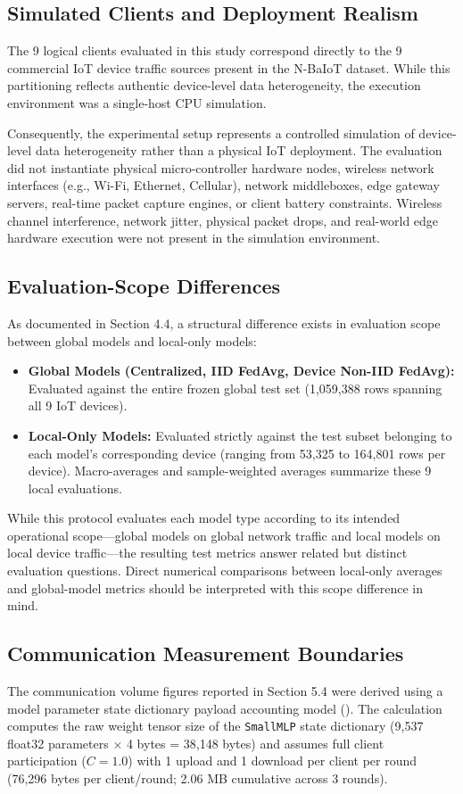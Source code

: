 \documentclass[11pt,a4paper]{article}
\begin{document}
\subsection{Simulated Clients and Deployment Realism}
The 9 logical clients evaluated in this study correspond directly to the 9 commercial IoT device traffic sources present in the N-BaIoT dataset. While this partitioning reflects authentic device-level data heterogeneity, the execution environment was a single-host CPU simulation.

Consequently, the experimental setup represents a controlled simulation of device-level data heterogeneity rather than a physical IoT deployment. The evaluation did not instantiate physical micro-controller hardware nodes, wireless network interfaces (e.g., Wi-Fi, Ethernet, Cellular), network middleboxes, edge gateway servers, real-time packet capture engines, or client battery constraints. Wireless channel interference, network jitter, physical packet drops, and real-world edge hardware execution were not present in the simulation environment.

\subsection{Evaluation-Scope Differences}
As documented in Section 4.4, a structural difference exists in evaluation scope between global models and local-only models:

\begin{itemize}
    \item \textbf{Global Models (Centralized, IID FedAvg, Device Non-IID FedAvg):} Evaluated against the entire frozen global test set (1,059,388 rows spanning all 9 IoT devices).
    \item \textbf{Local-Only Models:} Evaluated strictly against the test subset belonging to each model's corresponding device (ranging from 53,325 to 164,801 rows per device). Macro-averages and sample-weighted averages summarize these 9 local evaluations.
\end{itemize}

While this protocol evaluates each model type according to its intended operational scope—global models on global network traffic and local models on local device traffic—the resulting test metrics answer related but distinct evaluation questions. Direct numerical comparisons between local-only averages and global-model metrics should be interpreted with this scope difference in mind.

\subsection{Communication Measurement Boundaries}
The communication volume figures reported in Section 5.4 were derived using a model parameter state dictionary payload accounting model (\texttt{}). The calculation computes the raw weight tensor size of the \texttt{SmallMLP} state dictionary (9,537 float32 parameters $\times$ 4 bytes = 38,148 bytes) and assumes full client participation ($C=1.0$) with 1 upload and 1 download per client per round (76,296 bytes per client/round; 2.06 MB cumulative across 3 rounds).
\end{document}
